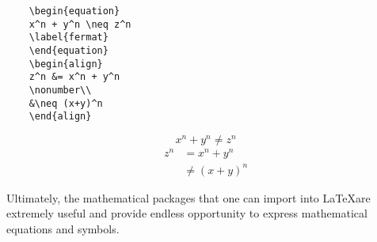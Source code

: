 \documentclass[a4paper, 11pt]{report}
\begin{document}
    \begin{verbatim}
    \begin{equation}
    x^n + y^n \neq z^n
    \label{fermat}
    \end{equation}
    \begin{align}
    z^n &= x^n + y^n
    \nonumber\\
    &\neq (x+y)^n
    \end{align}
    \end{verbatim}
    
    \begin{equation}
    x^n + y^n \neq z^n
    \label{fermat}
    \end{equation}
    \begin{align}
    z^n &= x^n + y^n
    \nonumber\\
    &\neq (x+y)^n
    \end{align}

    \noindent
    Ultimately, the mathematical packages that one can import into \LaTeX \space are extremely useful and provide endless opportunity to express mathematical equations and symbols.
    \\
	
\end{document}
